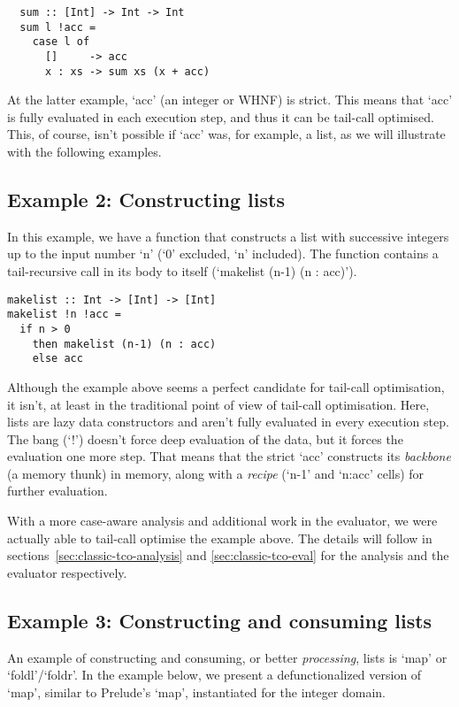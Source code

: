 \documentclass[diploma]{softlab-thesis}
\begin{document}
\begin{verbatim}
  sum :: [Int] -> Int -> Int
  sum l !acc = 
    case l of 
      []     -> acc 
      x : xs -> sum xs (x + acc) 
\end{verbatim}

At the latter example, `acc' (an integer or WHNF) is strict. This means that `acc' is 
fully evaluated in each execution step, and thus it can be tail-call optimised. This, of course,
isn't possible if `acc' was, for example, a list, as we will illustrate with the following examples.


\subsection {Example 2: Constructing lists}
\label{sec:example2}

In this example, we have a function that constructs a list with successive 
integers up to the input number `n' (`0' excluded, `n' included). The function contains 
a tail-recursive call in its body to itself (`makelist (n-1) (n : acc)'). 

\begin{verbatim}
makelist :: Int -> [Int] -> [Int]
makelist !n !acc = 
  if n > 0 
    then makelist (n-1) (n : acc)
    else acc
\end{verbatim}

Although the example above seems a perfect candidate for tail-call optimisation, it isn't, 
at least in the traditional point of view of tail-call optimisation. Here, lists are 
lazy data constructors and aren't fully evaluated in every execution step. The bang (`!') doesn't 
force deep evaluation of the data, but it forces the evaluation one more step. That means that the strict 
`acc' constructs its \textit{backbone} (a memory thunk) in memory, along with a \textit{recipe} 
(`n-1' and `n:acc' cells) for further evaluation. 

With a more case-aware analysis and additional work in the evaluator, 
we were actually able to tail-call optimise the example
above. The details will follow in sections~\ref{sec:classic-tco-analysis} and \ref{sec:classic-tco-eval} for the analysis 
and the evaluator respectively.

\subsection {Example 3: Constructing and consuming lists}
\label{sec:example3}

An example of constructing and consuming, or better \textit{processing}, lists is `map' or `foldl'/`foldr'.
In the example below, we present a defunctionalized version of `map', similar to Prelude's `map', instantiated for
the integer domain.
\end{document}
